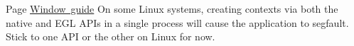 
\begin{DoxyRefList}
\item[Page \mbox{\hyperlink{window_guide}{Window guide}} ]\label{bug__bug000001}%
%
On some Linux systems, creating contexts via both the native and E\+GL A\+P\+Is in a single process will cause the application to segfault. Stick to one A\+PI or the other on Linux for now.
\end{DoxyRefList}